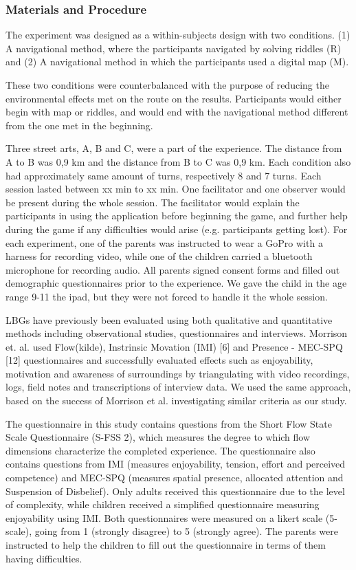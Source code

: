 \subsubsection{Materials and Procedure}
The experiment was designed as a within-subjects design with two conditions. (1) A navigational method, where the participants navigated by solving riddles (R) and (2) A navigational method in which the participants used a digital map (M).

These two conditions were counterbalanced with the purpose of reducing the environmental effects met on the route on the results. Participants would either begin with map or riddles, and would end with the navigational method different from the one met in the beginning. 

Three street arts, A, B and C, were a part of the experience. The distance from A to B was 0,9 km and the distance from B to C was 0,9 km. Each condition also had approximately same amount of turns, respectively 8 and 7 turns. Each session lasted between xx min to xx min. One facilitator and one observer would be present during the whole session. The facilitator would explain the participants in using the application before beginning the game, and further help during the game if any difficulties would arise (e.g. participants getting lost). For each experiment, one of the parents was instructed to wear a GoPro with a harness for recording video, while one of the children carried a bluetooth microphone for recording audio. All parents signed consent forms and filled out demographic questionnaires prior to the experience. We gave the child in the age range 9-11 the ipad, but they were not forced to handle it the whole session. 

LBGs have previously been evaluated using both qualitative and quantitative methods including observational studies, questionnaires and interviews. Morrison et. al. used Flow(kilde), Instrinsic Movation (IMI) [6] and Presence - MEC-SPQ [12] questionnaires and successfully evaluated effects such as enjoyability, motivation and awareness of surroundings by triangulating with video recordings, logs, field notes and transcriptions of interview data. We used the same approach, based on the success of Morrison et al. investigating similar criteria as our study. 

The questionnaire in this study contains questions from the Short Flow State Scale Questionnaire (S-FSS 2), which measures the degree to which flow dimensions characterize the
completed experience. The questionnaire also contains questions from IMI (measures enjoyability, tension, effort and perceived competence) and MEC-SPQ (measures spatial presence, allocated attention and Suspension of Disbelief). Only adults received this questionnaire due to the level of complexity, while children received a simplified questionnaire measuring enjoyability using IMI. Both questionnaires were measured on a likert scale (5-scale), going from 1 (strongly disagree) to 5 (strongly agree). The parents were instructed to help the children to fill out the questionnaire in terms of them having difficulties. 
 
